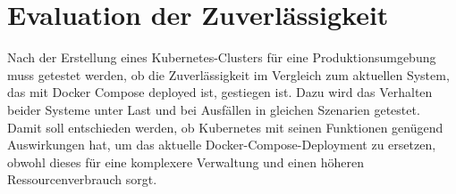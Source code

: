 \chapter{Evaluation der Zuverlässigkeit}
Nach der Erstellung eines Kubernetes-Clusters für eine Produktionsumgebung muss getestet werden, ob die Zuverlässigkeit im Vergleich zum aktuellen System, das mit Docker Compose deployed ist, gestiegen ist.
Dazu wird das Verhalten beider Systeme unter Last und bei Ausfällen in gleichen Szenarien getestet.
Damit soll entschieden werden, ob Kubernetes mit seinen Funktionen genügend Auswirkungen hat, um das aktuelle Docker-Compose-Deployment zu ersetzen, obwohl dieses für eine komplexere Verwaltung und einen höheren Ressourcenverbrauch sorgt. 




